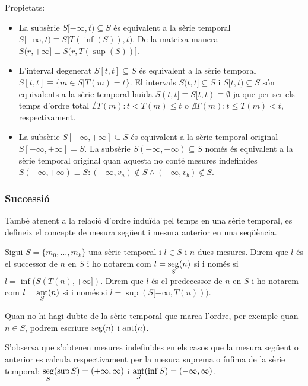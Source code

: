 Propietats:
\begin{itemize}
\item La subsèrie $S[-\infty,t)\subseteq S$ és equivalent a la sèrie
  temporal $S[-\infty,t) \equiv S[T(\inf(S)),t)$. De la mateixa manera
  $S(r,+\infty] \equiv S(r,T(\sup(S))]$.

\item L'interval degenerat $S[t,t]\subseteq S$ és equivalent a la
  sèrie temporal $S[t,t] \equiv \{m\in S | T(m)=t \}$. El intervals
  $S(t,t]\subseteq S$ i $S[t,t)\subseteq S$ són equivalents a la sèrie
  temporal buida $S(t,t] \equiv S[t,t) \equiv \emptyset$ ja que per
  ser els temps d'ordre total $\nexists T(m): t < T(m) \leq t$ o
  $\nexists T(m): t \leq T(m) < t$, respectivament. 

\item La subsèrie $S[-\infty,+\infty] \subseteq S$ és equivalent a la
  sèrie temporal original $S[-\infty,+\infty] = S$. La subsèrie
  $S(-\infty,+\infty) \subseteq S$ només és equivalent a la sèrie
  temporal original quan aquesta no conté mesures indefinides
  $S(-\infty,+\infty) \equiv S: (-\infty,v_a)\notin S \wedge
  (+\infty,v_b)\notin S$.
\end{itemize}




\subsubsection{Successió}

També atenent a la relació d'ordre induïda pel temps en una sèrie temporal, es
defineix el concepte de mesura següent i mesura anterior en una
seqüència.


\begin{definition}\label{def:sgst:seg}\label{def:sgst:ant}
  Sigui $S=\{m_0, \ldots, m_k\}$ una sèrie temporal i $l\in S$ i $n$ dues
  mesures. Direm que $l$ és el successor de $n$ en $S$ i ho notarem
  com $l=\operatorname*{seg}\limits_S(n)$ si i només si $l=\inf(S(T(n),+\infty])$.
  Direm que $l$ és el predecessor de $n$ en $S$ i ho notarem com
  $l=\operatorname*{ant}\limits_S(n)$ si i només si $l=\sup(S[-\infty,T(n)))$.

Quan no hi hagi dubte de la sèrie temporal que marca l'ordre, per
exemple quan $n\in S$, podrem escriure $\operatorname*{seg}(n)$ i $\operatorname*{ant}(n)$.
\end{definition}

S'observa que s'obtenen mesures indefinides en els casos que la
mesura següent o anterior es calcula respectivament per la mesura
suprema o ínfima de la sèrie temporal: $\operatorname*{seg}\limits_S(\sup
S)=(+\infty,\infty)$ i $\operatorname*{ant}\limits_S(\inf S)=(-\infty,\infty)$.

